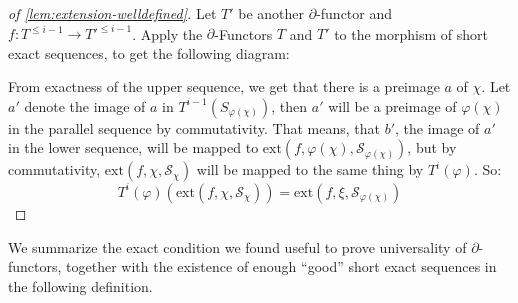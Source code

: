 \begin{proof}[of \cref{lem:extension-welldefined}]
  Let $T'$ be another $\partial$-functor and $f:T^{\leq i-1}\to T'^{\leq i-1}$.
  Apply the $\partial$-Functors $T$ and $T'$ to the morphism of short exact sequences,
  to get the following diagram:
  \begin{center}
  \end{center}
  From exactness of the upper sequence, we get that there is a preimage $a$ of $\chi$.
  Let $a'$ denote the image of $a$ in $T^{i-1}(S_{\varphi(\chi)})$,
  then $a'$ will be a preimage of ${\varphi(\chi)}$ in the parallel sequence by commutativity.
  That means, that $b'$, the image of $a'$ in the lower sequence,
  will be mapped to $ \mathrm{ext}(f,\varphi(\chi),\mathcal{S}_{\varphi(\chi)})$,
  but by commutativity, $\mathrm{ext}(f,\chi,\mathcal{S}_\chi)$ will be mapped to the same thing by $T^i(\varphi)$.
  So:
  \[ T^i(\varphi)(\mathrm{ext}(f,\chi,\mathcal{S}_\chi))=\mathrm{ext}(f,\xi,\mathcal{S}_{\varphi(\chi)})\]  
\end{proof}

We summarize the exact condition we found useful to prove universality of $\partial$-functors,
together with the existence of enough ``good'' short exact sequences in the following definition.

